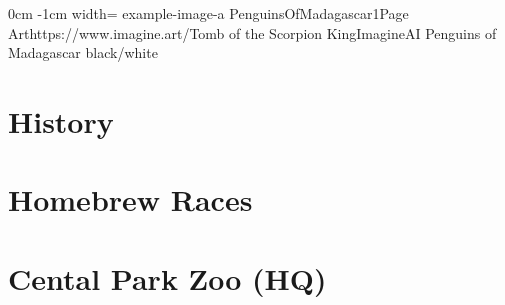 \documentclass[letterpaper,openany,twoside,twocolumn]{book}
\begin{document}
	\DungeonSheetGeometry

%
	{0cm}%
	{-1cm}%
	{width=\paperwidth}%
	{example-image-a}%
	{%
		{PenguinsOfMadagascar1}{Page \thepage}{Art}{https://www.imagine.art/}{Tomb of the Scorpion King}{ImagineAI}%
	}%
	{Penguins of Madagascar}%
	{}%
	{black/white}%
	
	\clearpage
	\chapter*{History}
	
	\clearpage
	\chapter*{Homebrew Races}
	
	\clearpage
	\chapter*{Cental Park Zoo (HQ)}
	\begin{minipage}{\paperwidth}
		\begin{tikzpicture}[outer sep=0pt, inner sep=0pt, every shadow/.style={opacity=.8,fill=black}]
			
		\end{tikzpicture}
	\end{minipage}
\end{document}
